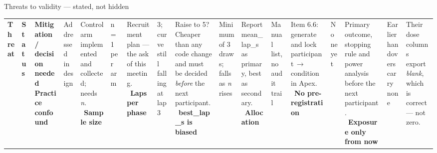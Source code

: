 \documentclass[aspectratio=169,10pt]{beamer}
\newcommand{\kw}[1]{\textcolor{cblue}{\textbf{#1}}}
\newcommand{\code}[1]{{\ttfamily\small #1}}
\newcommand{\bad}[1]{\textcolor{cred}{#1}}
\begin{document}
\begin{frame}{Threats to validity --- stated, not hidden}
  \vspace{-0.2em}
  \begin{center}\footnotesize
  \begin{tabular}{@{}L{4.2cm}L{5.1cm}L{4.6cm}@{}}
    \toprule
    \textbf{Threat} & \textbf{Status} & \textbf{Mitigation / decision needed} \
    \midrule
    \kw{Practice confound} & Addressed in design & Control arm implemented and
      collected; needs \emph{n}. \
    \kw{Sample size} & \bad{n = 1 per arm} & Recruitment plan --- the ask of this
      meeting. \
    \kw{Laps per phase} & 3; curve still falling at lap 3 & Raise to 5? Cheaper than
      any code change and must be decided \emph{before} the next participant. \
    \kw{\code{best\_lap\_s} is biased} & Minimum of 3 draws; falls as \emph{n} rises &
      Report \code{mean\_lap\_s} as primary, \code{best} as secondary. \
    \kw{Allocation} & Manual list, no audit trail & Item 6.6: generate and lock
      participant\,$\rightarrow$\,condition in Apex. \
    \kw{No pre-registration} & None yet & Primary outcome, stopping rule and
      power analysis before the next participant. \
    \kw{Exposure only from now} & Earlier handovers carry none & Their dose columns
      export \emph{blank}, which is correct --- not zero. \
    \bottomrule
  \end{tabular}
  \end{center}
\end{frame}
\end{document}
